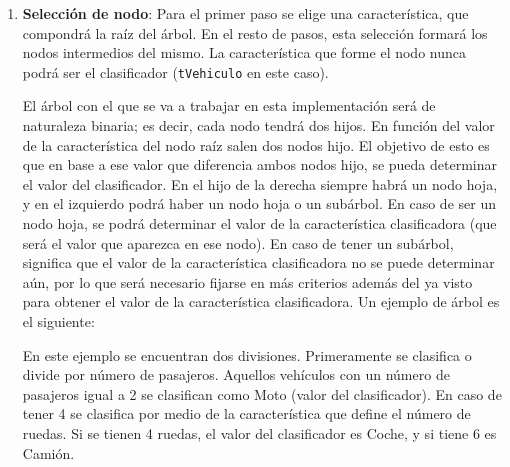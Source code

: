 \documentclass[12pt]{report}\usepackage[]{graphicx}\usepackage[dvipsnames]{xcolor}
\begin{document}
	 			\begin{enumerate}[label = \textbf{\arabic*.}]
	 				\item \textbf{Selección de nodo}: Para el primer paso se elige una característica, que compondrá la raíz del árbol. En el resto de pasos, esta selección formará los nodos intermedios del mismo. La característica que forme el nodo nunca podrá ser el clasificador (\texttt{tVehiculo} en este caso).
	 				
	 				El árbol con el que se va a trabajar en esta implementación será de naturaleza binaria; es decir, cada nodo tendrá dos hijos. En función del valor de la característica del nodo raíz salen dos nodos hijo. El objetivo de esto es que en base a ese valor que diferencia ambos nodos hijo, se pueda determinar el valor del clasificador. En el hijo de la derecha siempre habrá un nodo hoja, y en el izquierdo podrá haber un nodo hoja o un subárbol. En caso de ser un nodo hoja, se podrá determinar el valor de la característica clasificadora (que será el valor que aparezca en ese nodo). En caso de tener un subárbol, significa que el valor de la característica clasificadora no se puede determinar aún, por lo que será necesario fijarse en más criterios además del ya visto para obtener el valor de la característica clasificadora. Un ejemplo de árbol es el siguiente:
	 				
	 				\begin{center}
	 				\end{center}
	 				
	 				En este ejemplo se encuentran dos divisiones. Primeramente se clasifica o divide por número de pasajeros. Aquellos vehículos con un número de pasajeros igual a 2 se clasifican como Moto (valor del clasificador). En caso de tener 4 se clasifica por medio de la característica que define el número de ruedas. Si se tienen 4 ruedas, el valor del clasificador es Coche, y si tiene 6 es Camión.\\
	 				

\end{enumerate}
\end{document}
